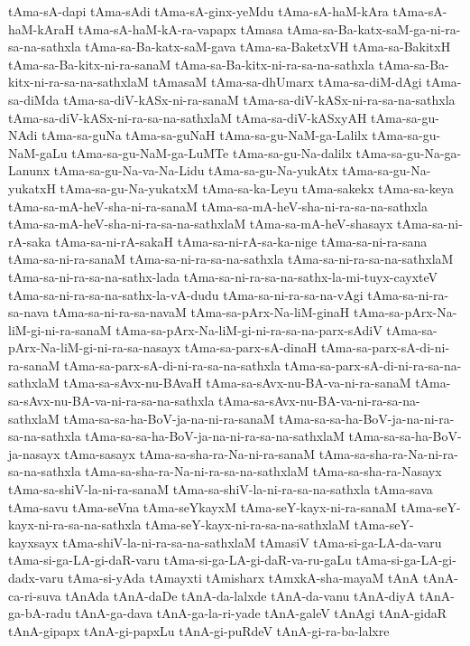 {tAma-sA-dapi
tAma-sAdi
tAma-sA-ginx-yeMdu
tAma-sA-haM-kAra
tAma-sA-haM-kAraH
tAma-sA-haM-kA-ra-vapapx
tAmasa
tAma-sa-Ba-katx-saM-ga-ni-ra-sa-na-sathxla
tAma-sa-Ba-katx-saM-gava
tAma-sa-BaketxVH
tAma-sa-BakitxH
tAma-sa-Ba-kitx-ni-ra-sanaM
tAma-sa-Ba-kitx-ni-ra-sa-na-sathxla
tAma-sa-Ba-kitx-ni-ra-sa-na-sathxlaM
tAmasaM
tAma-sa-dhUmarx
tAma-sa-diM-dAgi
tAma-sa-diMda
tAma-sa-diV-kASx-ni-ra-sanaM
tAma-sa-diV-kASx-ni-ra-sa-na-sathxla
tAma-sa-diV-kASx-ni-ra-sa-na-sathxlaM
tAma-sa-diV-kASxyAH
tAma-sa-gu-NAdi
tAma-sa-guNa
tAma-sa-guNaH
tAma-sa-gu-NaM-ga-Lalilx
tAma-sa-gu-NaM-gaLu
tAma-sa-gu-NaM-ga-LuMTe
tAma-sa-gu-Na-dalilx
tAma-sa-gu-Na-ga-Lanunx
tAma-sa-gu-Na-va-Na-Lidu
tAma-sa-gu-Na-yukAtx
tAma-sa-gu-Na-yukatxH
tAma-sa-gu-Na-yukatxM
tAma-sa-ka-Leyu
tAma-sakekx
tAma-sa-keya
tAma-sa-mA-heV-sha-ni-ra-sanaM
tAma-sa-mA-heV-sha-ni-ra-sa-na-sathxla
tAma-sa-mA-heV-sha-ni-ra-sa-na-sathxlaM
tAma-sa-mA-heV-shasayx
tAma-sa-ni-rA-saka
tAma-sa-ni-rA-sakaH
tAma-sa-ni-rA-sa-ka-nige
tAma-sa-ni-ra-sana
tAma-sa-ni-ra-sanaM
tAma-sa-ni-ra-sa-na-sathxla
tAma-sa-ni-ra-sa-na-sathxlaM
tAma-sa-ni-ra-sa-na-sathx-lada
tAma-sa-ni-ra-sa-na-sathx-la-mi-tuyx-cayxteV
tAma-sa-ni-ra-sa-na-sathx-la-vA-dudu
tAma-sa-ni-ra-sa-na-vAgi
tAma-sa-ni-ra-sa-nava
tAma-sa-ni-ra-sa-navaM
tAma-sa-pArx-Na-liM-ginaH
tAma-sa-pArx-Na-liM-gi-ni-ra-sanaM
tAma-sa-pArx-Na-liM-gi-ni-ra-sa-na-parx-sAdiV
tAma-sa-pArx-Na-liM-gi-ni-ra-sa-nasayx
tAma-sa-parx-sA-dinaH
tAma-sa-parx-sA-di-ni-ra-sanaM
tAma-sa-parx-sA-di-ni-ra-sa-na-sathxla
tAma-sa-parx-sA-di-ni-ra-sa-na-sathxlaM
tAma-sa-sAvx-nu-BAvaH
tAma-sa-sAvx-nu-BA-va-ni-ra-sanaM
tAma-sa-sAvx-nu-BA-va-ni-ra-sa-na-sathxla
tAma-sa-sAvx-nu-BA-va-ni-ra-sa-na-sathxlaM
tAma-sa-sa-ha-BoV-ja-na-ni-ra-sanaM
tAma-sa-sa-ha-BoV-ja-na-ni-ra-sa-na-sathxla
tAma-sa-sa-ha-BoV-ja-na-ni-ra-sa-na-sathxlaM
tAma-sa-sa-ha-BoV-ja-nasayx
tAma-sasayx
tAma-sa-sha-ra-Na-ni-ra-sanaM
tAma-sa-sha-ra-Na-ni-ra-sa-na-sathxla
tAma-sa-sha-ra-Na-ni-ra-sa-na-sathxlaM
tAma-sa-sha-ra-Nasayx
tAma-sa-shiV-la-ni-ra-sanaM
tAma-sa-shiV-la-ni-ra-sa-na-sathxla
tAma-sava
tAma-savu
tAma-seVna
tAma-seYkayxM
tAma-seY-kayx-ni-ra-sanaM
tAma-seY-kayx-ni-ra-sa-na-sathxla
tAma-seY-kayx-ni-ra-sa-na-sathxlaM
tAma-seY-kayxsayx
tAma-shiV-la-ni-ra-sa-na-sathxlaM
tAmasiV
tAma-si-ga-LA-da-varu
tAma-si-ga-LA-gi-daR-varu
tAma-si-ga-LA-gi-daR-va-ru-gaLu
tAma-si-ga-LA-gi-dadx-varu
tAma-si-yAda
tAmayxti
tAmisharx
tAmxkA-sha-mayaM
tAnA
tAnA-ca-ri-suva
tAnAda
tAnA-daDe
tAnA-da-lalxde
tAnA-da-vanu
tAnA-diyA
tAnA-ga-bA-radu
tAnA-ga-dava
tAnA-ga-la-ri-yade
tAnA-galeV
tAnAgi
tAnA-gidaR
tAnA-gipapx
tAnA-gi-papxLu
tAnA-gi-puRdeV
tAnA-gi-ra-ba-lalxre
}
